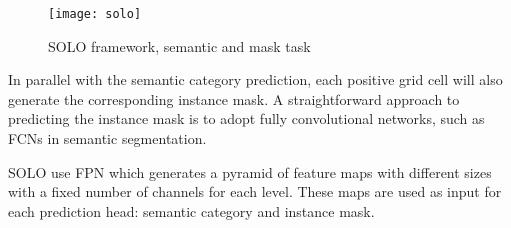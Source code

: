 \begin{figure}[h]
    \centering
    \texttt{[image: solo]}
    \caption{SOLO framework, semantic and mask task}
\end{figure}

In parallel with the semantic category prediction, each positive grid cell will also generate the corresponding instance mask. A straightforward approach to
predicting the instance mask is to adopt fully convolutional networks, such as FCNs in semantic segmentation.

SOLO use FPN which generates a pyramid of feature maps with different sizes with a fixed number of channels for each level. These maps are used as input for each prediction
head: semantic category and instance mask.










